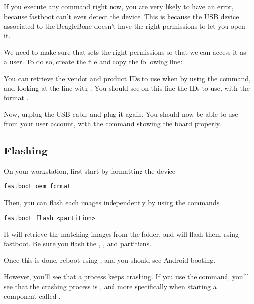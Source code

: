 If you execute any command right now, you are very likely to have an
error, because fastboot can't even detect the device. This is because
the USB device associated to the BeagleBone doesn't have the right
permissions to let you open it.

We need to make sure that  sets the right permissions so
that we can access it as a user. To do so, create the file
 and copy the following line:


You can retrieve the vendor and product IDs to use when by using the
 command, and looking at the line with . You should see on this line the IDs to use, with
the format
.

Now, unplug the USB cable and plug it again. You should now be able to
use  from your user account, with the command
 showing the board properly.

\subsection{Flashing}

On your workstation, first start by formatting the device

\begin{verbatim}
fastboot oem format
\end{verbatim}

Then, you can flash each images independently by using the commands

\begin{verbatim}
fastboot flash <partition>
\end{verbatim}

It will retrieve the matching images from the  folder, and
will flash them using fastboot. Be sure you flash the ,
,  and  partitions.

Once this is done, reboot using , and you should
see Android booting.

However, you'll see that a process keeps crashing. If you use the
 command, you'll see that the crashing process is
, and more specifically when starting a component called
.

